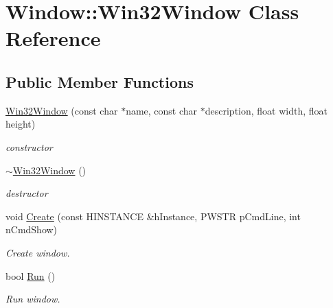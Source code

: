 \hypertarget{class_window_1_1_win32_window}{}\section{Window\+:\+:Win32\+Window Class Reference}
\label{class_window_1_1_win32_window}
\subsection*{Public Member Functions}
\begin{DoxyCompactItemize}
\item 
\mbox{\label{class_window_1_1_win32_window_aa5cc09b32fa5f6559205f06e153be2a5}} 
\mbox{\hyperlink{class_window_1_1_win32_window_aa5cc09b32fa5f6559205f06e153be2a5}{Win32\+Window}} (const char $\ast$name, const char $\ast$description, float width, float height)
\begin{DoxyCompactList}\small\item\em constructor \end{DoxyCompactList}\item 
\mbox{\label{class_window_1_1_win32_window_a29d0d1d16a72689d4372abd5bec6f0db}} 
\mbox{\hyperlink{class_window_1_1_win32_window_a29d0d1d16a72689d4372abd5bec6f0db}{$\sim$\+Win32\+Window}} ()
\begin{DoxyCompactList}\small\item\em destructor \end{DoxyCompactList}\item 
\mbox{\label{class_window_1_1_win32_window_a402f39d4cecbbf911378f60df893e806}} 
void \mbox{\hyperlink{class_window_1_1_win32_window_a402f39d4cecbbf911378f60df893e806}{Create}} (const H\+I\+N\+S\+T\+A\+N\+CE \&h\+Instance, P\+W\+S\+TR p\+Cmd\+Line, int n\+Cmd\+Show)
\begin{DoxyCompactList}\small\item\em Create window. \end{DoxyCompactList}\item 
\mbox{\label{class_window_1_1_win32_window_a41fc46a9316efd98d8aa368a759f0ffe}} 
bool \mbox{\hyperlink{class_window_1_1_win32_window_a41fc46a9316efd98d8aa368a759f0ffe}{Run}} ()
\begin{DoxyCompactList}\small\item\em Run window. \end{DoxyCompactList}\item 

\end{DoxyCompactItemize}
